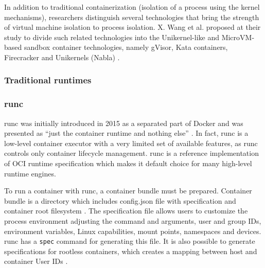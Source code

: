 In addition to traditional containerization (isolation of a process using the kernel mechanisms), researchers distinguish several technologies that bring the strength of virtual machine isolation to process isolation. X. Wang et al. proposed at their study to divide such related technologies into the Unikernel-like and MicroVM-based sandbox container technologies, namely gVisor, Kata containers, Firecracker and Unikernels (Nabla) \cite{j:1}.

\clearpage
\subsubsection{Traditional runtimes}

\subsubsection*{runc}

runc was initially introduced in 2015 as a separated part of Docker and was presented as ``just the container runtime and nothing else'' \cite{b:dockerrunc}. In fact, runc is a low-level container executor with a very limited set of available features, as runc controls only container lifecycle management. runc is a reference implementation of OCI runtime specification which makes it default choice for many high-level runtime engines.

To run a container with runc, a container bundle must be prepared. Container bundle is a directory which includes config.json file with specification and container root filesystem \cite{m:runc}. The specification file allows users to customize the process environment adjusting the command and arguments, user and group IDs, environment variables, Linux capabilities, mount points, namespaces and devices. runc has a \texttt{spec} command for generating this file. It is also possible to generate specifications for rootless containers, which creates a mapping between host and container User IDs \cite{j:2}.


